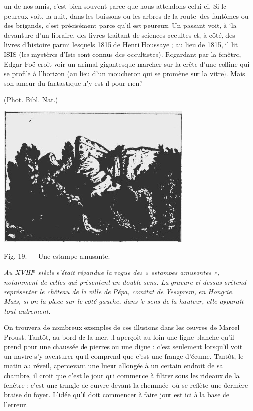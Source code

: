 un de nos amis, c’est bien souvent parce que nous attendons celui-ci.
Si le peureux voit, la nuit, dans les buissons ou les arbres de la route,
des fantômes ou des brigands, c’est précisément parce qu’il est peureux.
Un passant voit, à ‘la devanture d’un libraire, des livres traitant
de sciences occultes et, à côté, des livres d'histoire parmi lesquels
1815 de Henri Houssaye ; au lieu de 1815, il lit ISIS (les mystères
d’Isis sont connus des occultistes). Regardant par la fenêtre, Edgar
Poë croit voir un animal gigantesque marcher sur la crête d’une colline
qui se profile à l’horizon (au lieu d’un moucheron qui se promène
sur la vitre). Mais son amour du fantastique n’y est-il pour rien?

(Phot. Bibl. Nat.)

\begin{center}
\includegraphics[scale=0.7]{./05_sensible/019}

Fig. 19. — Une estampe amusante.
\end{center}

{\it Au {\footnotesize XVIII}$^\text{e}$ siècle s'était répandue la vogue des « estampes amusantes », notamment de celles
qui présentent un double sens. La gravure ci-dessus prétend représenter le château de
la ville de Pépa, comitat de Veszprem, en Hongrie. Mais, si on la place sur le côté gauche,
dans le sens de la hauteur, elle apparaît tout autrement.}

On trouvera de nombreux exemples de ces illusions dans les œuvres de
Marcel Proust. Tantôt, au bord de la mer, il aperçoit au loin une ligne
blanche qu'il prend pour une chaussée de pierres ou une digue : c’est seulement
lorsqu'il voit un navire s’y aventurer qu'il comprend que c’est une
frange d'écume. Tantôt, le matin au réveil, apercevant une lueur allongée
à un certain endroit de sa chambre, il croit que c’est le jour qui commence à
filtrer sous les rideaux de la fenêtre : c'est une tringle de cuivre devant la
cheminée, où se reflète une dernière braise du foyer. L'idée qu’il doit commencer
à faire jour est ici à la base de l'erreur.

